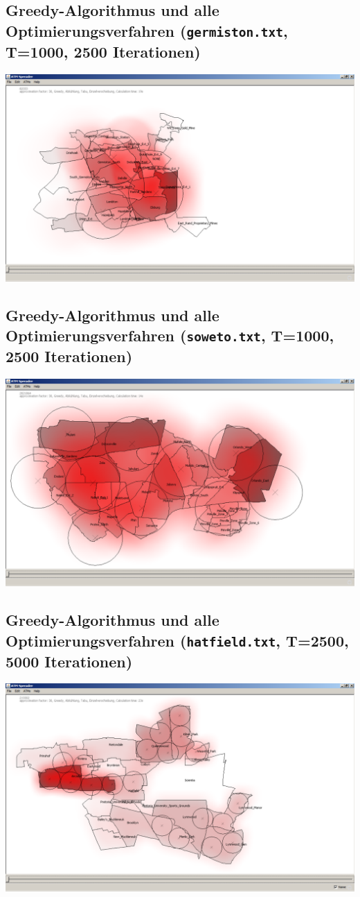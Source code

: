 \documentclass[12pt,a4paper]{article}
\begin{document}
\subsection{Greedy-Algorithmus und alle Optimierungsverfahren (\texttt{germiston.txt}, T=1000, 2500 Iterationen)}
\includegraphics[width=1.0\textwidth]{ger.pdf}

\subsection{Greedy-Algorithmus und alle Optimierungsverfahren (\texttt{soweto.txt}, T=1000, 2500 Iterationen)}
\includegraphics[width=1.0\textwidth]{soweto.pdf}

\subsection{Greedy-Algorithmus und alle Optimierungsverfahren (\texttt{hatfield.txt}, T=2500, 5000 Iterationen)}
\includegraphics[width=1.0\textwidth]{hatfield_allles.pdf}
\end{document}
